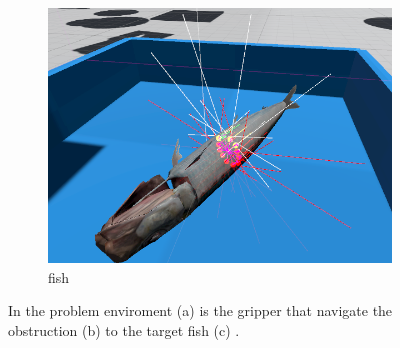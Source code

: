 \begin{figure}
\begin{subfigure}[t]{0.33\textwidth}
\label{fig:obstructions-sim}
\end{subfigure}%
    \hfill
\begin{subfigure}[t]{0.33\textwidth}
\centering
\includegraphics[width=\linewidth]{figures/target}
\caption{fish}
\label{fig:fish-sim}
\end{subfigure}%

\caption{In the problem enviroment 
(a) %
is the gripper that navigate the obstruction 
(b) %
to the target fish 
(c)%
.}
\label{fig:problem-environment}
\end{figure}
